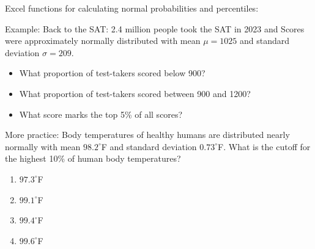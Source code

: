 \documentclass[11pt,letterpaper,twoside]{article}
\begin{document}
\newpage

Excel functions for calculating normal probabilities and percentiles:

\vspace{190pt}

Example: Back to the SAT: 2.4 million people took the SAT in 2023 and Scores were approximately normally distributed with mean $\mu = 1025$ and standard deviation $\sigma= 209$.

\begin{itemize}

\item What proportion of test-takers scored below 900? \vspace{60pt}

\item What proportion of test-takers scored between 900 and 1200? \vspace{60pt}

\item What score marks the top 5\% of all scores? \vspace{60pt}

\end{itemize}

More practice: Body temperatures of healthy humans are distributed nearly normally with mean $98.2^\circ$F and standard deviation $0.73^\circ$F. What is the cutoff for the highest 10\% of human body temperatures?

\begin{enumerate}

\item[(a)] $97.3^\circ$F

\item[(b)] $99.1^\circ$F

\item[(c)] $99.4^\circ$F

\item[(d)] $99.6^\circ$F

\end{enumerate}

\label{totalpag}
\end{document}
